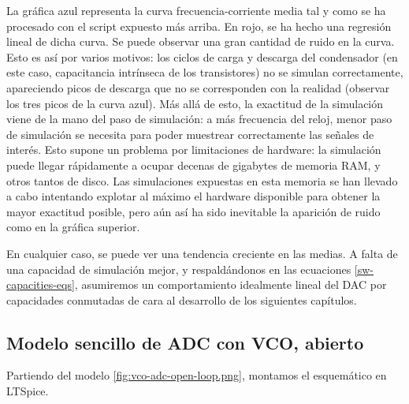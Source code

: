 \documentclass[12pt]{report} %
\begin{document}
	La gráfica azul representa la curva frecuencia-corriente media tal y como se ha procesado con el script expuesto más arriba. En rojo, se ha hecho una regresión lineal de dicha curva. Se puede observar una gran cantidad de ruido en la curva. Esto es así por varios motivos: los ciclos de carga y descarga del condensador (en este caso, capacitancia intrínseca de los transistores) no se simulan correctamente, apareciendo picos de descarga que no se corresponden con la realidad (observar los tres picos de la curva azul). Más allá de esto, la exactitud de la simulación viene de la mano del paso de simulación: a más frecuencia del reloj, menor paso de simulación se necesita para poder muestrear correctamente las señales de interés. Esto supone un problema por limitaciones de hardware: la simulación puede llegar rápidamente a ocupar decenas de gigabytes de memoria RAM, y otros tantos de disco. Las simulaciones expuestas en esta memoria se han llevado a cabo intentando explotar al máximo el hardware disponible para obtener la mayor exactitud posible, pero aún así ha sido inevitable la aparición de ruido como en la gráfica superior.
	
	En cualquier caso, se puede ver una tendencia creciente en las medias. A falta de una capacidad de simulación mejor, y respaldándonos en las ecuaciones \ref{sw-capacities-eqs}, asumiremos un comportamiento idealmente lineal del DAC por capacidades conmutadas de cara al desarrollo de los siguientes capítulos.
	
	
	\subsection{Modelo sencillo de ADC con VCO, abierto} %
	
	Partiendo del modelo \ref{fig:vco-adc-open-loop.png}, montamos el esquemático en LTSpice.
	
\end{document}
